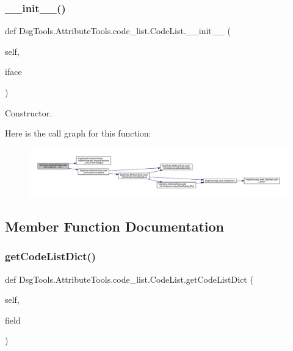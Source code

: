 \subsubsection{\texorpdfstring{\+\_\+\+\_\+init\+\_\+\+\_\+()}{\_\_init\_\_()}}
{\footnotesize\ttfamily def Dsg\+Tools.\+Attribute\+Tools.\+code\+\_\+list.\+Code\+List.\+\_\+\+\_\+init\+\_\+\+\_\+ (\begin{DoxyParamCaption}\item[{}]{self,  }\item[{}]{iface }\end{DoxyParamCaption})}

\begin{DoxyVerb}Constructor.\end{DoxyVerb}
 Here is the call graph for this function\+:
\nopagebreak
\begin{figure}[H]
\begin{center}
\leavevmode
\includegraphics[width=350pt]{class_dsg_tools_1_1_attribute_tools_1_1code__list_1_1_code_list_ab79f81016ec69893abf40f98519791b5_cgraph}
\end{center}
\end{figure}


\subsection{Member Function Documentation}
\mbox{\label{class_dsg_tools_1_1_attribute_tools_1_1code__list_1_1_code_list_ac8a5029bd39e2d9d9b23deb2954cd5a9}} 
\subsubsection{\texorpdfstring{get\+Code\+List\+Dict()}{getCodeListDict()}}
{\footnotesize\ttfamily def Dsg\+Tools.\+Attribute\+Tools.\+code\+\_\+list.\+Code\+List.\+get\+Code\+List\+Dict (\begin{DoxyParamCaption}\item[{}]{self,  }\item[{}]{field }\end{DoxyParamCaption})}

